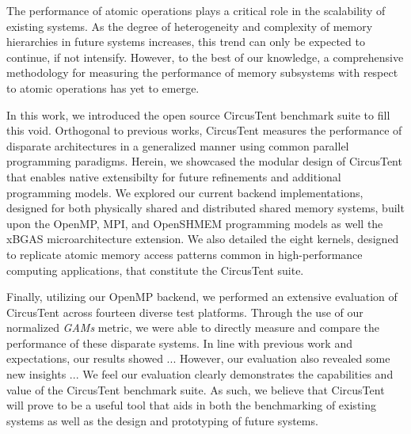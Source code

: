 
The performance of atomic operations plays a critical role in the scalability of existing systems.
As the degree of heterogeneity and complexity of memory hierarchies in future systems increases, this trend can only be expected to continue, if not intensify.
However, to the best of our knowledge, a comprehensive methodology for measuring the performance of memory subsystems with respect to atomic operations has yet to emerge.

In this work, we introduced the open source CircusTent benchmark suite to fill this void.
Orthogonal to previous works, CircusTent measures the performance of disparate architectures in a generalized manner using common parallel programming paradigms.
Herein, we showcased the modular design of CircusTent that enables native extensibilty for future refinements and additional programming models.
We explored our current backend implementations, designed for both physically shared and distributed shared memory systems, built upon the OpenMP, MPI, and OpenSHMEM programming models as well the xBGAS microarchitecture extension.
We also detailed the eight kernels, designed to replicate atomic memory access patterns common in high-performance computing applications, that constitute the CircusTent suite.

Finally, utilizing our OpenMP backend, we performed an extensive evaluation of CircusTent across fourteen diverse test platforms.
Through the use of our normalized \textit{GAMs} metric, we were able to directly measure and compare the performance of these disparate systems.
In line with previous work and expectations, our results showed ...
However, our evaluation also revealed some new insights ...
We feel our evaluation clearly demonstrates the capabilities and value of the CircusTent benchmark suite.
As such, we believe that CircusTent will prove to be a useful tool that aids in both the benchmarking of existing systems as well as the design and prototyping of future systems.

